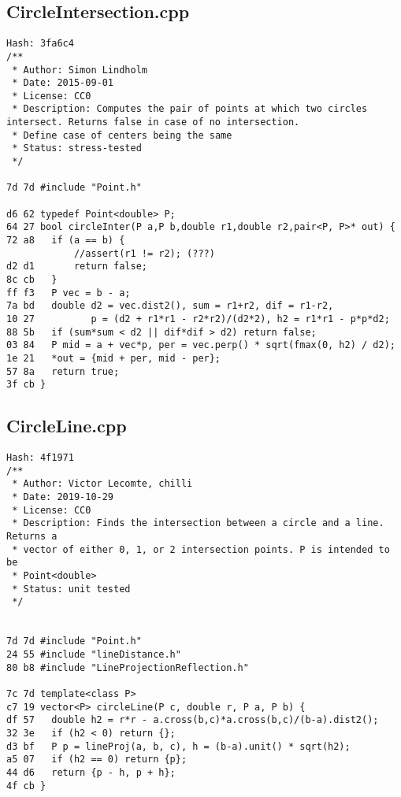 \documentclass[11pt, a4paper, twoside]{article}
\begin{document}
\subsection{CircleIntersection.cpp}
\begin{lstlisting}
Hash: 3fa6c4
/**
 * Author: Simon Lindholm
 * Date: 2015-09-01
 * License: CC0
 * Description: Computes the pair of points at which two circles intersect. Returns false in case of no intersection.
 * Define case of centers being the same
 * Status: stress-tested
 */

7d 7d #include "Point.h"

d6 62 typedef Point<double> P;
64 27 bool circleInter(P a,P b,double r1,double r2,pair<P, P>* out) {
72 a8 	if (a == b) { 
      		//assert(r1 != r2); (???)
d2 d1 		return false; 
8c cb 	}
ff f3 	P vec = b - a;
7a bd 	double d2 = vec.dist2(), sum = r1+r2, dif = r1-r2,
10 27 	       p = (d2 + r1*r1 - r2*r2)/(d2*2), h2 = r1*r1 - p*p*d2;
88 5b 	if (sum*sum < d2 || dif*dif > d2) return false;
03 84 	P mid = a + vec*p, per = vec.perp() * sqrt(fmax(0, h2) / d2);
1e 21 	*out = {mid + per, mid - per};
57 8a 	return true;
3f cb }
\end{lstlisting}

\subsection{CircleLine.cpp}
\begin{lstlisting}
Hash: 4f1971
/**
 * Author: Victor Lecomte, chilli
 * Date: 2019-10-29
 * License: CC0
 * Description: Finds the intersection between a circle and a line. Returns a
 * vector of either 0, 1, or 2 intersection points. P is intended to be
 * Point<double>
 * Status: unit tested
 */


7d 7d #include "Point.h"
24 55 #include "lineDistance.h"
80 b8 #include "LineProjectionReflection.h"

7c 7d template<class P>
c7 19 vector<P> circleLine(P c, double r, P a, P b) {
df 57 	double h2 = r*r - a.cross(b,c)*a.cross(b,c)/(b-a).dist2();
32 3e 	if (h2 < 0) return {};
d3 bf 	P p = lineProj(a, b, c), h = (b-a).unit() * sqrt(h2);
a5 07 	if (h2 == 0) return {p};
44 d6 	return {p - h, p + h};
4f cb }
\end{lstlisting}
\end{document}
